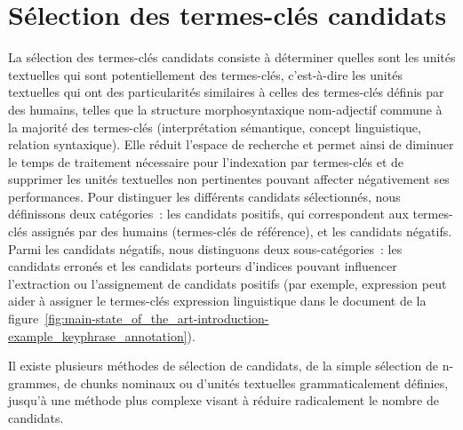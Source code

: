   \section{Sélection des termes-clés candidats}
  \label{sec:main-state_of_the_art-keyphrase_candidate_selection}
    La sélection des termes-clés candidats consiste à déterminer quelles sont
    les unités textuelles qui sont potentiellement des termes-clés, c'est-à-dire
    les unités textuelles qui ont des particularités similaires à celles des
    termes-clés définis par des humains, telles que la structure
    morphosyntaxique nom-adjectif commune à la majorité des termes-clés
    (\og{}interprétation sémantique\fg{}, \og{}concept linguistique\fg{},
    \og{}relation syntaxique\fg{}). Elle réduit l'espace de recherche et permet
    ainsi de diminuer le temps de traitement nécessaire pour l'indexation par
    termes-clés et de supprimer les
    unités textuelles non pertinentes pouvant affecter négativement ses
    performances. Pour distinguer les différents candidats sélectionnés, nous
    définissons deux catégories~: les candidats positifs, qui
    correspondent aux termes-clés assignés par des humains (termes-clés de
    référence), et les candidats négatifs. Parmi les candidats négatifs,
    nous distinguons deux sous-catégories~: les candidats erronés et les
    candidats porteurs d'indices pouvant influencer
    l'extraction ou l'assignement de candidats positifs (par exemple,
    \og{}expression\fg{} peut aider à assigner le termes-clés \og{}expression
    linguistique\fg{} dans le document de la
    figure~\ref{fig:main-state_of_the_art-introduction-example_keyphrase_annotation}).

    Il existe plusieurs méthodes de sélection de candidats, de la simple
    sélection de n-grammes, de chunks nominaux ou d'unités textuelles
    grammaticalement définies, jusqu'à une méthode plus complexe visant à
    réduire radicalement le nombre de candidats.

